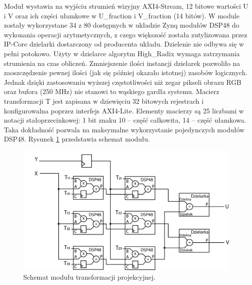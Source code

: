 Moduł wystawia na wyjściu strumień wizyjny AXI4-Stream, 12 bitowe wartości U i V oraz ich części ułamkowe w U\_fraction i V\_fraction (14 bitów). %
W module zostały wykorzystane 34 z 80 dostępnych w układzie Zynq modułów DSP48 do wykonania operacji arytmetycznych, z czego większość została zutylizowana przez IP-Core dzielarki dostarczony od producenta układu. %
Dzielenie nie odbywa się w pełni potokowo. Użyty w dzielarce algorytm High\_Radix wymaga zatrzymania strumienia na czas obliczeń. Zmniejszenie ilości instancji dzielarek pozwoliło na zaoszczędzenie pewnej ilości (jak się później okazało istotnej) zasobów logicznych.
Jednak dzięki zastosowaniu wyższej częstotliwości niż zegar pikseli obrazu RGB oraz bufora (250 MHz) nie stanowi to wąskiego gardła systemu. %
Macierz transformacji T jest zapisana w dziewięciu 32 bitowych rejestrach i konfigurowalna poprzez interfejs AXI4-Lite. 
Elementy macierzy są 25 liczbami w notacji stałoprzecinkowej: 1 bit znaku 10 – część całkowita, 14 – część ułamkowa. Taka dokładność pozwala na maksymalne wykorzystanie pojedynczych modułów DSP48. Rysunek \ref{fig:transfProjek} przedstawia schemat modułu.
\begin{figure}
\centering
\includegraphics[width=0.70\linewidth]{images/transfProjek.png}
\caption[Schemat modułu transformacji projekcyjnej.]{Schemat modułu transformacji projekcyjnej.}
\label{fig:transfProjek}
\end{figure}
